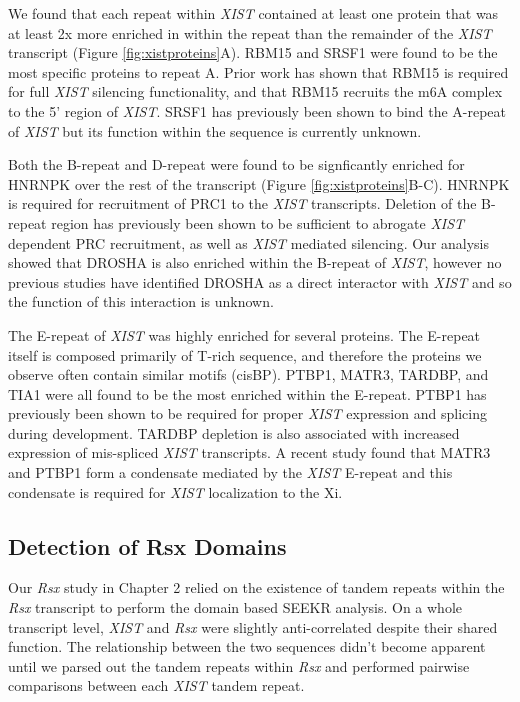 We found that each repeat within \emph{XIST} contained at least one protein that was at least 2x more enriched in within the repeat than the remainder of the \emph{XIST} transcript (Figure \ref{fig:xistproteins}A). RBM15 and SRSF1 were found to be the most specific proteins to repeat A. Prior work has shown that RBM15 is required for full \emph{XIST} silencing functionality, and that RBM15 recruits the m6A complex to the 5' region of \emph{XIST}. SRSF1 has previously been shown to bind the A-repeat of \emph{XIST} but its function within the sequence is currently unknown.

Both the B-repeat and D-repeat were found to be signficantly enriched for HNRNPK over the rest of the transcript (Figure \ref{fig:xistproteins}B-C). HNRNPK is required for recruitment of PRC1 to the \emph{XIST} transcripts. Deletion of the B-repeat region has previously been shown to be sufficient to abrogate \emph{XIST} dependent PRC recruitment, as well as \emph{XIST} mediated silencing. Our analysis showed that DROSHA is also enriched within the B-repeat of \emph{XIST}, however no previous studies have identified DROSHA as a direct interactor with \emph{XIST} and so the function of this interaction is unknown.

The E-repeat of \emph{XIST} was highly enriched for several proteins. The E-repeat itself is composed primarily of T-rich sequence, and therefore the proteins we observe often contain similar motifs (cisBP). PTBP1, MATR3, TARDBP, and TIA1 were all found to be the most enriched within the E-repeat. PTBP1 has previously been shown to be required for proper \emph{XIST} expression and splicing during development. TARDBP depletion is also associated with increased expression of mis-spliced \emph{XIST} transcripts. A recent study found that MATR3 and PTBP1 form a condensate mediated by the \emph{XIST} E-repeat and this condensate is required for \emph{XIST} localization to the Xi. 

\subsection{Detection of Rsx Domains}
Our \emph{Rsx} study in Chapter 2 relied on the existence of tandem repeats within the \emph{Rsx} transcript to perform the domain based SEEKR analysis. On a whole transcript level, \emph{XIST} and \emph{Rsx} were slightly anti-correlated despite their shared function. The relationship between the two sequences didn't become apparent until we parsed out the tandem repeats within \emph{Rsx} and performed pairwise comparisons between each \emph{XIST} tandem repeat. 


